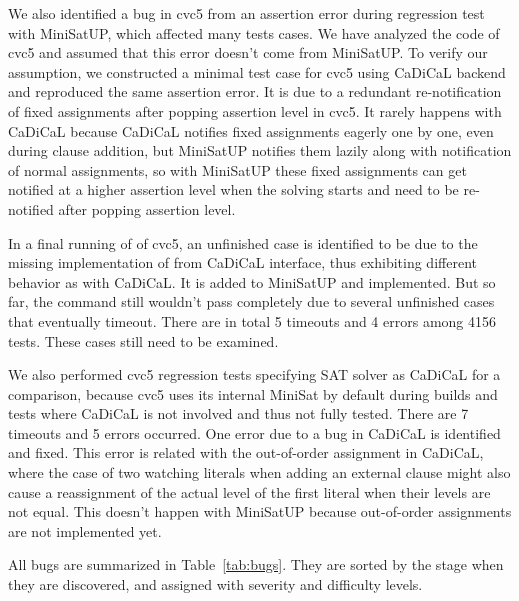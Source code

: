 We also identified a bug in cvc5 from an assertion error during regression test with MiniSatUP, which affected many tests cases. We have analyzed the code of cvc5 and assumed that this error doesn't come from MiniSatUP. To verify our assumption, we constructed a minimal test case for cvc5 using CaDiCaL backend and reproduced the same assertion error. It is due to a redundant re-notification of fixed assignments after popping assertion level in cvc5. It rarely happens with CaDiCaL because CaDiCaL notifies fixed assignments eagerly one by one, even during clause addition, but MiniSatUP notifies them lazily along with notification of normal assignments, so with MiniSatUP these fixed assignments can get notified at a higher assertion level when the solving starts and need to be re-notified after popping assertion level.

In a final running of  of cvc5, an unfinished case is identified to be due to the missing implementation of  from CaDiCaL interface, thus exhibiting different behavior as with CaDiCaL. It is added to MiniSatUP and implemented. But so far, the  command still wouldn't pass completely due to several unfinished cases that eventually timeout. There are in total 5 timeouts and 4 errors among 4156 tests. These cases still need to be examined.

We also performed cvc5 regression tests specifying SAT solver as CaDiCaL for a comparison, because cvc5 uses its internal MiniSat by default during builds and tests where CaDiCaL is not involved and thus not fully tested. There are 7 timeouts and 5 errors occurred. One error due to a bug in CaDiCaL is identified and fixed. This error is related with the out-of-order assignment in CaDiCaL, where the  case of two watching literals when adding an external clause might also cause a reassignment of the actual level of the first literal when their levels are not equal. This doesn't happen with MiniSatUP because out-of-order assignments are not implemented yet.

All bugs are summarized in Table~\ref{tab:bugs}. They are sorted by the stage when they are discovered, and assigned with severity and difficulty levels.

